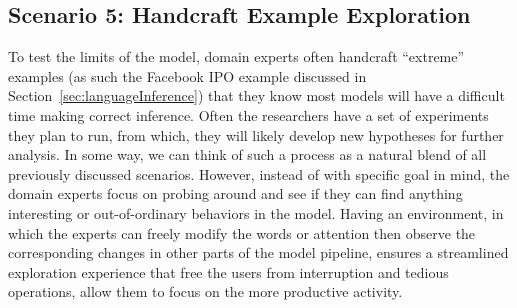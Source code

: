\subsection{Scenario 5: Handcraft Example Exploration}
To test the limits of the model, domain experts often handcraft ``extreme'' examples (as such the Facebook IPO example discussed in Section~\ref{sec:languageInference}) that they know most models will have a difficult time making correct inference.
%
Often the researchers have a set of experiments they plan to run, from which, they will likely develop new hypotheses for further analysis.
%
In some way, we can think of such a process as a natural blend of all previously discussed scenarios. However,  instead of with specific goal in mind, the domain experts focus on probing around and see if they can find anything interesting or out-of-ordinary behaviors in the model.
%
Having an environment, in which the experts can freely modify the words or attention then observe the corresponding changes in other parts of the model pipeline, ensures a streamlined exploration experience that free the users from interruption and tedious operations, allow them to focus on the more productive activity.

